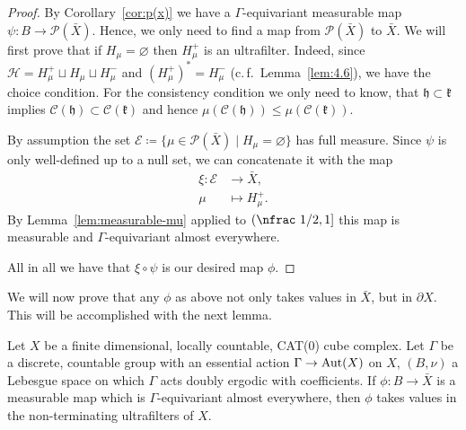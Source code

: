 \begin{proof}
  By Corollary~\ref{cor:p(x)} we have a \(\Gamma\)-equivariant measurable map \(\psi\colon B \to \mathcal{P}(\bar X)\). Hence, we only need to find a map from \(\mathcal{P}(\bar X)\) to \(\bar X\). We will first prove that if \(H_\mu = \varnothing\) then \(H_\mu^+\) is an ultrafilter. Indeed, since \(\mathcal{H} = H_\mu^+ \sqcup H_\mu \sqcup H_\mu^-\) and \((H_\mu^+)^\ast = H_\mu^-\) (c.\,f.~Lemma~\ref{lem:4.6}), we have the choice condition. For the consistency condition we only need to know, that \(\mathfrak{h} \subset \mathfrak{k}\) implies \(\mathcal{C}(\mathfrak{h}) \subset \mathcal{C}(\mathfrak{k})\) and hence \(\mu(\mathcal{C}(\mathfrak{h}))\leq \mu(\mathcal{C}(\mathfrak{k}))\).

  By assumption the set \(\mathcal{E} \coloneqq \{\mu \in \mathcal{P}(\bar X) \mid H_\mu = \varnothing\}\) has full measure. Since \(\psi\) is only well-defined up to a null set, we can concatenate it with the map
  \begin{align*}
    \xi\colon \mathcal{E} &\to \bar X,\\
    \mu &\mapsto H_\mu^+.
  \end{align*}
  By Lemma~\ref{lem:measurable-mu} applied to \({(\text{\nfrac 1/2}, 1]}\) this map is measurable and \(\Gamma\)-equivariant almost everywhere.

  All in all we have that \(\xi \circ \psi\) is our desired map \(\phi\).
\end{proof}

We will now prove that any \(\phi\) as above not only takes values in \(\bar X\), but in \(\partial X\). This will be accomplished with the next lemma.

\begin{lemma}[{\cite[Lemma~4.11]{MR3509968}}]
  \label{lem:4.11}
  Let \(X\) be a finite dimensional, locally countable, CAT(0) cube complex. Let  \(\Gamma\) be a discrete, countable group with an essential action \(\Gamma \to \operatorname{Aut}(X)\) on \(X\), \((B, \nu)\) a Lebesgue space on which \(\Gamma\) acts doubly ergodic with coefficients. If \(\phi\colon B \to \bar X\) is a measurable map which is \(\Gamma\)-equivariant almost everywhere, then \(\phi\) takes values in the non-terminating ultrafilters of \(X\).
\end{lemma}

